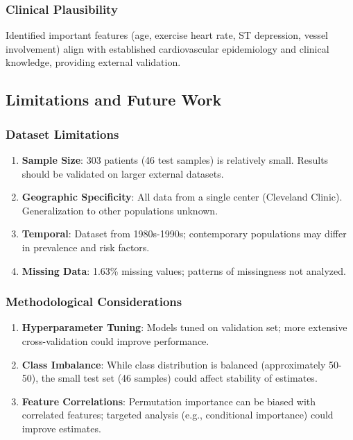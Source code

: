 \documentclass[journal]{IEEEtran}
\begin{document}
\subsubsection{Clinical Plausibility}

Identified important features (age, exercise heart rate, ST depression, vessel involvement) align with established cardiovascular epidemiology and clinical knowledge, providing external validation.

\subsection{Limitations and Future Work}

\subsubsection{Dataset Limitations}

\begin{enumerate}
    \item \textbf{Sample Size}: 303 patients (46 test samples) is relatively small. Results should be validated on larger external datasets.
    \item \textbf{Geographic Specificity}: All data from a single center (Cleveland Clinic). Generalization to other populations unknown.
    \item \textbf{Temporal}: Dataset from 1980s-1990s; contemporary populations may differ in prevalence and risk factors.
    \item \textbf{Missing Data}: 1.63\% missing values; patterns of missingness not analyzed.
\end{enumerate}

\subsubsection{Methodological Considerations}

\begin{enumerate}
    \item \textbf{Hyperparameter Tuning}: Models tuned on validation set; more extensive cross-validation could improve performance.
    \item \textbf{Class Imbalance}: While class distribution is balanced (approximately 50-50), the small test set (46 samples) could affect stability of estimates.
    \item \textbf{Feature Correlations}: Permutation importance can be biased with correlated features; targeted analysis (e.g., conditional importance) could improve estimates.
\end{enumerate}
\end{document}
